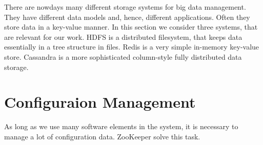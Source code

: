 There are nowdays many different storage systems for big data management.
They have different data models and, hence, different applications.
Often they store data in a key-value manner.
In this section we consider three systems, that are relevant for our work.
HDFS is a distributed filesystem, that keeps data essentially in a tree structure in files.
Redis is a very simple in-memory key-value store.
Cassandra is a more sophisticated column-style fully distributed data storage.





\section{Configuraion Management}

As long as we use many software elements in the system, it is necessary to manage a lot of configuration data.
ZooKeeper solve this task.

